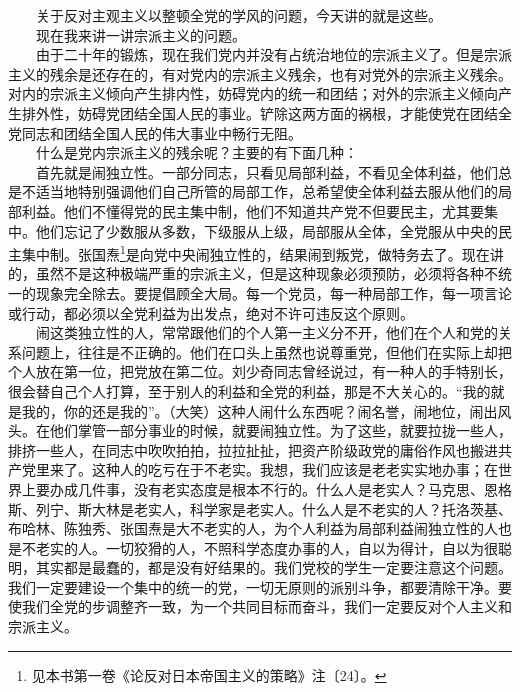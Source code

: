 \documentclass[cn,11pt,chinese]{elegantbook}
\begin{document}
　　关于反对主观主义以整顿全党的学风的问题，今天讲的就是这些。\\
　　现在我来讲一讲宗派主义的问题。\\
　　由于二十年的锻炼，现在我们党内并没有占统治地位的宗派主义了。但是宗派主义的残余是还存在的，有对党内的宗派主义残余，也有对党外的宗派主义残余。对内的宗派主义倾向产生排内性，妨碍党内的统一和团结；对外的宗派主义倾向产生排外性，妨碍党团结全国人民的事业。铲除这两方面的祸根，才能使党在团结全党同志和团结全国人民的伟大事业中畅行无阻。\\
　　什么是党内宗派主义的残余呢？主要的有下面几种：\\
　　首先就是闹独立性。一部分同志，只看见局部利益，不看见全体利益，他们总是不适当地特别强调他们自己所管的局部工作，总希望使全体利益去服从他们的局部利益。他们不懂得党的民主集中制，他们不知道共产党不但要民主，尤其要集中。他们忘记了少数服从多数，下级服从上级，局部服从全体，全党服从中央的民主集中制。张国焘\footnote[6]{ 见本书第一卷《论反对日本帝国主义的策略》注〔24〕。}是向党中央闹独立性的，结果闹到叛党，做特务去了。现在讲的，虽然不是这种极端严重的宗派主义，但是这种现象必须预防，必须将各种不统一的现象完全除去。要提倡顾全大局。每一个党员，每一种局部工作，每一项言论或行动，都必须以全党利益为出发点，绝对不许可违反这个原则。\\
　　闹这类独立性的人，常常跟他们的个人第一主义分不开，他们在个人和党的关系问题上，往往是不正确的。他们在口头上虽然也说尊重党，但他们在实际上却把个人放在第一位，把党放在第二位。刘少奇同志曾经说过，有一种人的手特别长，很会替自己个人打算，至于别人的利益和全党的利益，那是不大关心的。“我的就是我的，你的还是我的”。（大笑）这种人闹什么东西呢？闹名誉，闹地位，闹出风头。在他们掌管一部分事业的时候，就要闹独立性。为了这些，就要拉拢一些人，排挤一些人，在同志中吹吹拍拍，拉拉扯扯，把资产阶级政党的庸俗作风也搬进共产党里来了。这种人的吃亏在于不老实。我想，我们应该是老老实实地办事；在世界上要办成几件事，没有老实态度是根本不行的。什么人是老实人？马克思、恩格斯、列宁、斯大林是老实人，科学家是老实人。什么人是不老实的人？托洛茨基、布哈林、陈独秀、张国焘是大不老实的人，为个人利益为局部利益闹独立性的人也是不老实的人。一切狡猾的人，不照科学态度办事的人，自以为得计，自以为很聪明，其实都是最蠢的，都是没有好结果的。我们党校的学生一定要注意这个问题。我们一定要建设一个集中的统一的党，一切无原则的派别斗争，都要清除干净。要使我们全党的步调整齐一致，为一个共同目标而奋斗，我们一定要反对个人主义和宗派主义。\\
\end{document}
